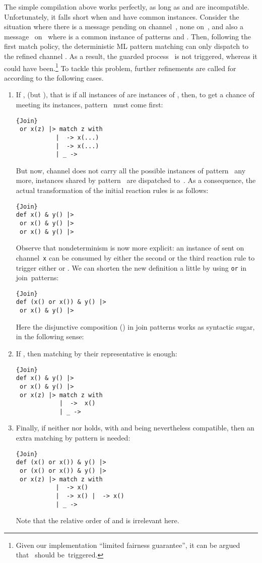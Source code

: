 \documentclass{LMCS}
\let \lst \lstinline
\renewcommand{\_}{\mathord{\rule[-.25ex]{1ex}{.15ex}}}
\begin{document}
The simple compilation above works perfectly, as long as  and
 are incompatible. Unfortunately, it falls short when 
and  have common instances.
Consider the situation where there is a message pending
on channel~, none on~, and also a message~
on~ where  is a common instance of patterns  and .
Then, following the first match policy, the
deterministic ML pattern matching can only dispatch  to the
refined channel .
As a result, the guarded process~ is not
triggered, whereas it could have been.\footnote{Given
our implementation ``limited fairness guarantee'', it
can be argued that~ should be~triggered.}
To tackle this problem, further
refinements are called for according to the following cases.
\begin{enumerate}[]
\item If , (but ), that
  is if all instances of  are instances of , then, to
  get a chance of meeting its instances, pattern~ must come
  first:
\begin{lstlisting}{Join}
 or x(z) |> match z with
           |  -> x(...)
           |  -> x(...)
           | _ -> 
\end{lstlisting}
But now, channel  does not carry all the possible
instances of pattern~ any more, instances shared by
pattern~ are dispatched to~. As a consequence,
the actual transformation of the initial reaction rules is as follows:
\begin{lstlisting}{Join}
def x() & y() |> 
 or x() & y() |> 
 or x() & y() |> 
\end{lstlisting}
Observe that nondeterminism is now more explicit: an instance of
 sent on channel~\lst"x" can be consumed by either the second
or the third reaction rule to trigger either  or .  We can
shorten the new definition a little by using \lst"or" in
join~patterns:
\begin{lstlisting}{Join}
def (x() or x()) & y() |> 
 or x() & y() |> 
\end{lstlisting}
Here the disjunctive composition () in join patterns
works as syntactic sugar, in the following sense: 


\item If , then matching by their representative
is enough:
\begin{lstlisting}{Join}
def x() & y() |> 
 or x() & y() |> 
 or x(z) |> match z with
            |  ->  x()
            | _ -> 
\end{lstlisting}

\item Finally, if neither  nor  holds, with  and  being nevertheless compatible,
  then an extra matching by pattern  is needed:
\begin{lstlisting}{Join}
def (x() or x()) & y() |> 
 or (x() or x()) & y() |> 
 or x(z) |> match z with
           |  -> x()
           |  -> x() |  -> x()
           | _ -> 
\end{lstlisting}
Note that the relative order of  and  is irrelevant here.
\end{enumerate}
\end{document}
